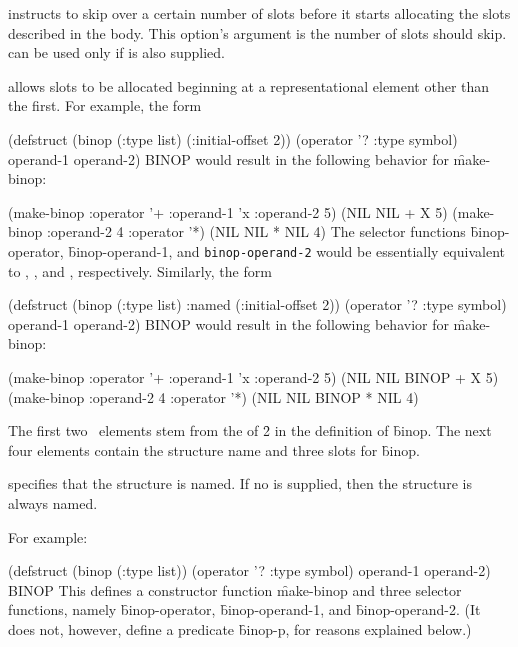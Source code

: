 
 instructs  to skip over a certain
number of slots before it starts allocating the slots described in the
body.  This option's argument is the number of slots  
should skip.   can be used only if  is also supplied.


 allows 
slots to be allocated beginning at a representational
element other than the first.  For example, the form

\code
 (defstruct (binop (:type list) (:initial-offset 2))
   (operator '? :type symbol)
   operand-1
   operand-2) \EV BINOP
\endcode
would result in the following behavior for \f{make-binop}:

\code
 (make-binop :operator '+ :operand-1 'x :operand-2 5)
\EV (NIL NIL + X 5)
 (make-binop :operand-2 4 :operator '*)
\EV (NIL NIL * NIL 4)
\endcode
The selector functions
\f{binop-operator}, \f{binop-operand-1},
and {\tt binop-operand-2} would be essentially equivalent to ,
, and , respectively.
Similarly, the form

\code
 (defstruct (binop (:type list) :named (:initial-offset 2))
   (operator '? :type symbol)
   operand-1
   operand-2) \EV BINOP
\endcode
would result in the following behavior for \f{make-binop}:
                    
\code
 (make-binop :operator '+ :operand-1 'x :operand-2 5) \EV (NIL NIL BINOP + X 5)
 (make-binop :operand-2 4 :operator '*) \EV (NIL NIL BINOP * NIL 4)
\endcode

The first two \nil\ elements stem from the  of \f{2}
in the definition of \f{binop}.  The next four elements contain the
structure name and three slots for \f{binop}.  


 specifies that the structure is named.
If no  is supplied,
then the structure is always named.


For example:

\code
 (defstruct (binop (:type list))
   (operator '? :type symbol)
   operand-1
   operand-2) \EV BINOP
\endcode
This defines a constructor function \f{make-binop} and three
selector functions, namely \f{binop-operator}, \f{binop-operand-1},
and \f{binop-operand-2}.  (It does not, however, define a predicate
\f{binop-p}, for reasons explained below.)

